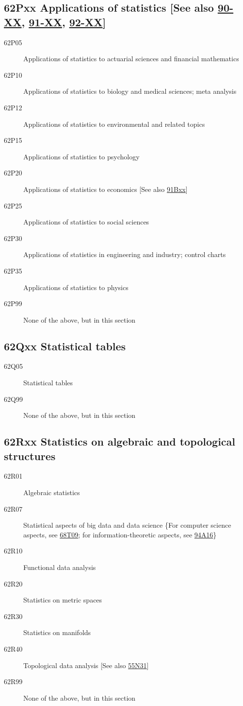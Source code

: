 \subsection*{62Pxx  Applications of statistics [See also \hyperref[90-XX]{90-XX}, \hyperref[91-XX]{91-XX}, \hyperref[92-XX]{92-XX}] }\label{62Pxx}
\begin{description}  
\item [62P05]\label{62P05} Applications of statistics to actuarial sciences and financial mathematics
\item [62P10]\label{62P10} Applications of statistics to biology and medical sciences; meta analysis
\item [62P12]\label{62P12} Applications of statistics to environmental and related topics
\item [62P15]\label{62P15} Applications of statistics to psychology
\item [62P20]\label{62P20} Applications of statistics to economics [See also \hyperref[91Bxx]{91Bxx}]
\item [62P25]\label{62P25} Applications of statistics to social sciences
\item [62P30]\label{62P30} Applications of statistics in engineering and industry; control charts
\item [62P35]\label{62P35} Applications of statistics to physics
\item [62P99]\label{62P99} None of the above, but in this section
\end{description}
\subsection*{62Qxx  Statistical tables }\label{62Qxx}
\begin{description}  
\item [62Q05]\label{62Q05} Statistical tables
\item [62Q99]\label{62Q99} None of the above, but in this section
\end{description}
\subsection*{62Rxx  Statistics on algebraic and topological structures }\label{62Rxx}
\begin{description}
\item [62R01]\label{62R01} Algebraic statistics
\item [62R07]\label{62R07} Statistical aspects of  big data and data science \{For computer science aspects, see \hyperref[68T09]{68T09}; for information-theoretic aspects, see \hyperref[94A16]{94A16}\}
\item [62R10]\label{62R10} Functional data analysis
\item [62R20]\label{62R20} Statistics on metric spaces
\item [62R30]\label{62R30} Statistics on manifolds
\item [62R40]\label{62R40} Topological data analysis [See also \hyperref[55N31]{55N31}]
\item [62R99]\label{62R99} None of the above, but in this section
\end{description}
